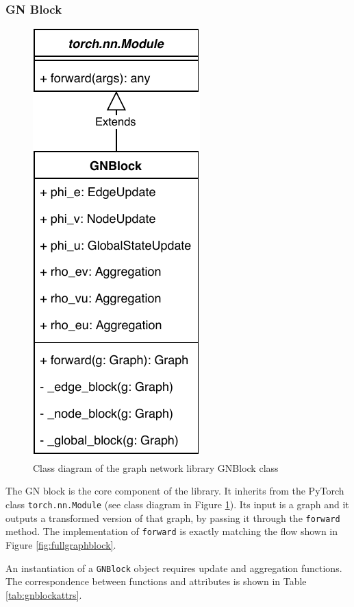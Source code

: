 \subsubsection{GN Block}

\begin{figure}\centering
    \includegraphics[scale=0.65]{resources/graphnets-block}
    \caption{Class diagram of the graph network library GNBlock class}\label{fig:classdiagramgnblock}
\end{figure}

The GN block is the core component of the library. It inherits from the PyTorch class \texttt{torch.nn.Module} (see class diagram in Figure \ref{fig:classdiagramgnblock}). Its input is a graph and it outputs a transformed version of that graph, by passing it through the \texttt{forward} method. The implementation of \texttt{forward} is exactly matching the flow shown in Figure \ref{fig:fullgraphblock}.

An instantiation of a \texttt{GNBlock} object requires update and aggregation functions. The correspondence between functions and attributes is shown in Table \ref{tab:gnblockattrs}.

